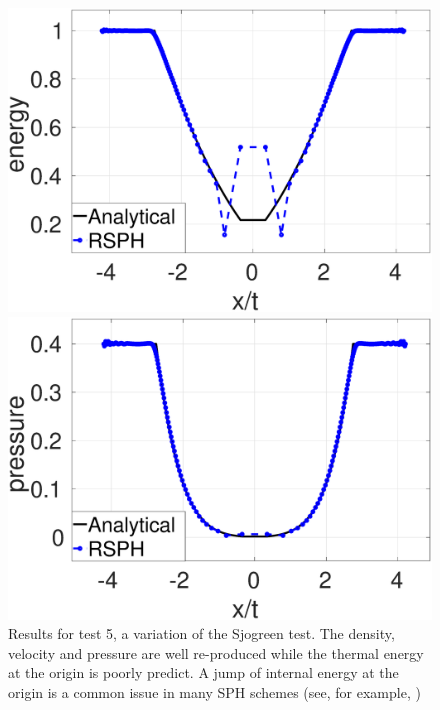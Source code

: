 \begin{figure}[H]
\begin{minipage}{.495\textwidth}
        \includegraphics[width=0.99 \textwidth]{Chapter-4/Figures/Sjogreen/Sjogreen-RCM-e-Adpt1}
    \end{minipage}%
    \begin{minipage}{.495 \textwidth}
        \centering
        \includegraphics[width=0.99 \textwidth]{Chapter-4/Figures/Sjogreen/Sjogreen-RCM-p-Adpt1}
    \end{minipage}%
    \caption{Results for test 5, a variation of the Sjogreen test. The density, velocity and pressure are well re-produced while the thermal energy at the origin is poorly predict. A jump of internal energy at the origin is a common issue in many SPH schemes (see, for example, \citep{monaghan1997sph,cha2003implementations,puri2014approximate})}
    \label{fig:RCM-Sjogreen}
\end{figure}

